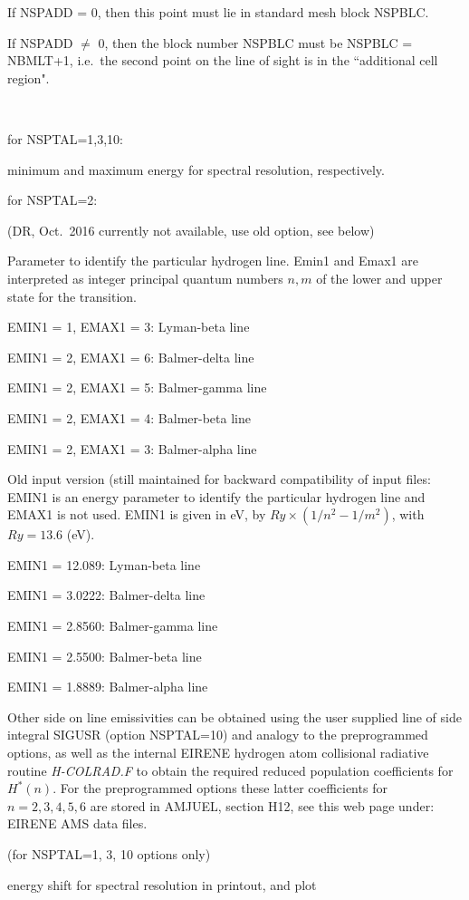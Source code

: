 \begin{description}
        If NSPADD = 0, then this  point must lie in standard mesh block
        NSPBLC.

        If NSPADD $\ne$ 0, then the block number NSPBLC must be NSPBLC = NBMLT+1, i.e.\
        the second point on the line of sight is in the ``additional cell region".
  \item[EMIN1, EMAX1] ~

        for NSPTAL=1,3,10:

        minimum and maximum energy for spectral resolution, respectively.

        for NSPTAL=2:

        \textcolor[rgb]{1.00,0.00,0.00}{(DR, Oct.\ 2016 currently not
          available, use old option, see below)}

        Parameter to identify the particular hydrogen line.
        Emin1 and Emax1 are interpreted as integer principal quantum numbers $n,m$ of
        the lower and upper state for the transition.

        EMIN1 = 1, EMAX1 = 3:  Lyman-beta line

        EMIN1 = 2, EMAX1 = 6:  Balmer-delta line

        EMIN1 = 2, EMAX1 = 5:  Balmer-gamma line

        EMIN1 = 2, EMAX1 = 4:  Balmer-beta line

        EMIN1 = 2, EMAX1 = 3:  Balmer-alpha line

        Old input version (still maintained for backward compatibility of input files:
        EMIN1 is an energy parameter to identify the particular hydrogen line and EMAX1
        is not used.
        EMIN1 is given in \si{\electronvolt}, by $Ry \times \left(1/n^2-1/m^2\right)$,
        with $Ry=\num{13.6}$ (\si{\electronvolt}).

        EMIN1 = 12.089: Lyman-beta line

        EMIN1 = 3.0222: Balmer-delta line

        EMIN1 = 2.8560: Balmer-gamma line

        EMIN1 = 2.5500: Balmer-beta line

        EMIN1 = 1.8889: Balmer-alpha line

        Other side on line emissivities can be obtained using the user supplied line of
        side integral SIGUSR (option NSPTAL=10) and analogy to the preprogrammed
        options, as well as the internal EIRENE hydrogen atom collisional radiative
        routine \emph{H-COLRAD.F} to obtain the required reduced population
        coefficients for $H^*(n)$.
        For the preprogrammed options these latter coefficients for $n=2,3,4,5,6$ are
        stored in AMJUEL, section H12, see this web page under: EIRENE AMS data files.

  \item[ESHIFT] (for NSPTAL=1, 3, 10 options only)

        energy shift for spectral resolution in printout, and plot
\end{description}

